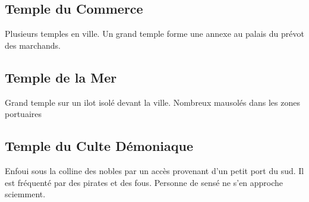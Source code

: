 \subsection{Temple du Commerce}

Plusieurs temples en ville. Un grand temple forme une annexe au palais du prévot des marchands.

\subsection{Temple de la Mer}

Grand temple sur un ilot isolé devant la ville. Nombreux mausolés dans les zones portuaires

\subsection{Temple du Culte Démoniaque}

Enfoui sous la colline des nobles par un accès provenant d'un petit port du sud. Il est fréquenté par des pirates et des fous. Personne de sensé ne s'en approche sciemment.
